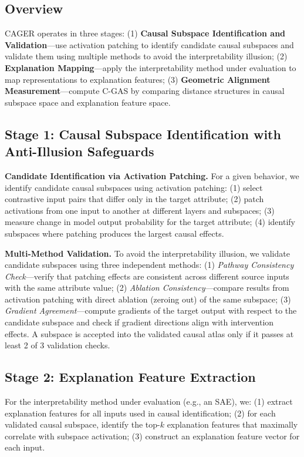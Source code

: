\documentclass{article}
\begin{document}
\subsection{Overview}

CAGER operates in three stages: (1) \textbf{Causal Subspace Identification and Validation}---use activation patching to identify candidate causal subspaces and validate them using multiple methods to avoid the interpretability illusion; (2) \textbf{Explanation Mapping}---apply the interpretability method under evaluation to map representations to explanation features; (3) \textbf{Geometric Alignment Measurement}---compute C-GAS by comparing distance structures in causal subspace space and explanation feature space.

\subsection{Stage 1: Causal Subspace Identification with Anti-Illusion Safeguards}

\textbf{Candidate Identification via Activation Patching.} For a given behavior, we identify candidate causal subspaces using activation patching: (1) select contrastive input pairs that differ only in the target attribute; (2) patch activations from one input to another at different layers and subspaces; (3) measure change in model output probability for the target attribute; (4) identify subspaces where patching produces the largest causal effects.

\textbf{Multi-Method Validation.} To avoid the interpretability illusion, we validate candidate subspaces using three independent methods: (1) \textit{Pathway Consistency Check}---verify that patching effects are consistent across different source inputs with the same attribute value; (2) \textit{Ablation Consistency}---compare results from activation patching with direct ablation (zeroing out) of the same subspace; (3) \textit{Gradient Agreement}---compute gradients of the target output with respect to the candidate subspace and check if gradient directions align with intervention effects. A subspace is accepted into the validated causal atlas only if it passes at least 2 of 3 validation checks.

\subsection{Stage 2: Explanation Feature Extraction}

For the interpretability method under evaluation (e.g., an SAE), we: (1) extract explanation features for all inputs used in causal identification; (2) for each validated causal subspace, identify the top-$k$ explanation features that maximally correlate with subspace activation; (3) construct an explanation feature vector for each input.
\end{document}
